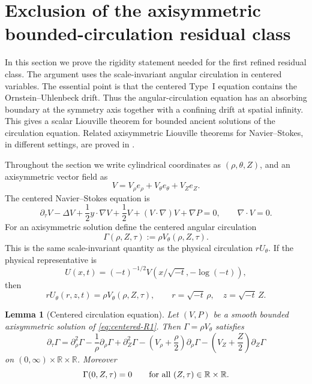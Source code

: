 \documentclass[11pt]{amsart}
\numberwithin{equation}{section}
\theoremstyle{plain}
\newtheorem{lemma}[theorem]{Lemma}
\theoremstyle{definition}
\theoremstyle{remark}
\begin{document}
\section{Exclusion of the axisymmetric bounded-circulation residual class}
\label{sec:R1-exclusion}

In this section we prove the rigidity statement needed for the first refined
residual class.  The argument uses the scale-invariant angular circulation in
centered variables.  The essential point is that the centered Type~I equation
contains the Ornstein--Uhlenbeck drift.  Thus the angular-circulation equation
has an absorbing boundary at the symmetry axis together with a confining drift
at spatial infinity.  This gives a scalar Liouville theorem for bounded ancient
solutions of the circulation equation.  Related axisymmetric Liouville theorems
for Navier--Stokes, in different settings, are proved in
\cite{LZZ2017,LRZ2022}.

Throughout the section we write cylindrical coordinates as
\((\rho,\theta,Z)\), and an axisymmetric vector field as
\[
   V=V_\rho e_\rho+V_\theta e_\theta+V_Z e_Z .
\]
The centered Navier--Stokes equation is
\begin{equation}\label{eq:centered-R1}
   \partial_\tau V-\Delta V+\frac12 y\cdot\nabla V+\frac12 V
   +(V\cdot\nabla)V+\nabla P=0,
   \qquad \nabla\cdot V=0 .
\end{equation}
For an axisymmetric solution define the centered angular circulation
\begin{equation}\label{eq:centered-Gamma-def}
   \Gamma(\rho,Z,\tau):=\rho V_\theta(\rho,Z,\tau).
\end{equation}
This is the same scale-invariant quantity as the physical circulation
\(rU_\theta\).  If the physical representative is
\[
   U(x,t)=(-t)^{-1/2}V(x/\sqrt{-t},-\log(-t)),
\]
then
\[
   rU_\theta(r,z,t)=\rho V_\theta(\rho,Z,\tau),
   \qquad r=\sqrt{-t}\,\rho,
   \quad z=\sqrt{-t}\,Z.
\]

\begin{lemma}[Centered circulation equation]\label{lem:centered-circulation-equation}
Let \((V,P)\) be a smooth bounded axisymmetric solution of
\eqref{eq:centered-R1}.  Then \(\Gamma=\rho V_\theta\) satisfies
\begin{equation}\label{eq:centered-Gamma-equation}
   \partial_\tau\Gamma
   =
   \partial_\rho^2\Gamma-\frac1\rho\partial_\rho\Gamma
      +\partial_Z^2\Gamma
   -\left(V_\rho+\frac\rho2\right)\partial_\rho\Gamma
   -\left(V_Z+\frac Z2\right)\partial_Z\Gamma
\end{equation}
on \((0,\infty)\times\mathbb R\times\mathbb R\).  Moreover
\begin{equation}\label{eq:axis-boundary-Gamma}
   \Gamma(0,Z,\tau)=0
   \qquad\hbox{for all }(Z,\tau)\in\mathbb R\times\mathbb R .
\end{equation}
\end{lemma}
\end{document}
